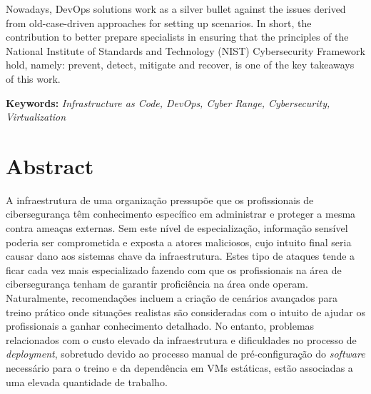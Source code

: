 Nowadays, DevOps solutions work as a silver bullet against the issues derived from old-case-driven approaches for setting up scenarios. In short, the contribution to better prepare specialists in ensuring that the principles of the National Institute of Standards and Technology (NIST) Cybersecurity Framework hold, namely: prevent, detect, mitigate and recover, is one of the key takeaways of this work.\\

\newcommand{\titles}[2]{\noindent\textbf{#1:} #2\\[2mm]}

\titles{Keywords}{\textit{Infrastructure as Code, DevOps, Cyber Range, Cybersecurity, Virtualization}}

\clearpage\phantom{}

\chapter*{Abstract}

A infraestrutura de uma organização pressupõe que os profissionais de cibersegurança têm conhecimento específico em administrar e proteger a mesma contra ameaças externas. Sem este nível de especialização, informação sensível poderia ser comprometida e exposta a atores maliciosos, cujo intuito final seria causar dano aos sistemas chave da infraestrutura. Estes tipo de ataques tende a ficar cada vez mais especializado fazendo com que os profissionais na área de cibersegurança tenham de garantir proficiência na área onde operam. Naturalmente, recomendações incluem a criação de cenários avançados para treino prático onde situações realistas são consideradas com o intuito de ajudar os profissionais a ganhar conhecimento detalhado. No entanto, problemas relacionados com o custo elevado da infraestrutura e dificuldades no processo de \textit{deployment}, sobretudo devido ao processo manual de pré-configuração do \textit{software} necessário para o treino e da dependência em VMs estáticas, estão associadas a uma elevada quantidade de trabalho.

